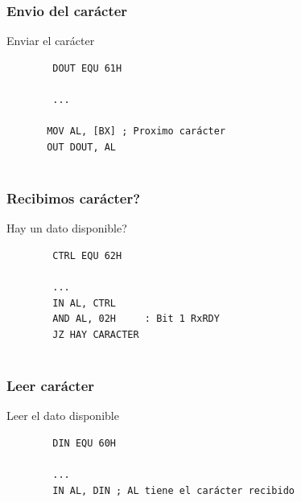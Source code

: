 \documentclass{beamer}
\begin{document}
\begin{frame}[fragile]
\frametitle{Envio del carácter}
\begin{block}{Enviar el carácter}
 \begin{verbatim}
        DOUT EQU 61H
         
        ...
           
       MOV AL, [BX] ; Proximo carácter
       OUT DOUT, AL
             
 \end{verbatim}
\end{block}

\end{frame}

\begin{frame}[fragile]
\frametitle{Recibimos carácter?}
\begin{block}{Hay un dato disponible?}
 \begin{verbatim}
        CTRL EQU 62H
         
        ...
        IN AL, CTRL
        AND AL, 02H     : Bit 1 RxRDY
        JZ HAY CARACTER
             
 \end{verbatim}
\end{block}

\end{frame}

\begin{frame}[fragile]
\frametitle{Leer carácter}
\begin{block}{Leer el dato disponible}
 \begin{verbatim}
        DIN EQU 60H
         
        ...
        IN AL, DIN ; AL tiene el carácter recibido
        
 \end{verbatim}
\end{block}

\end{frame}
\end{document}
